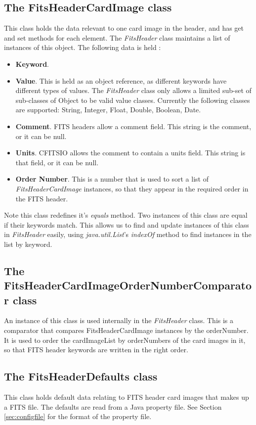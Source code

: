 \documentclass[10pt,a4paper]{article}
\begin{document}
\subsection{The FitsHeaderCardImage class}
This class holds the data relevant to one card image in the header, and has get and set methods for each
element. The {\em FitsHeader} class maintains a list of instances of this object. The following data
is held :
\begin{itemize}
\item {\bf Keyword}.
\item {\bf Value}. This is held as an object reference, as different keywords have different types of values.
	The {\em FitsHeader} class only allows a limited sub-set of sub-classes of Object to be valid value classes.
	Currently the following classes are supported: String, Integer, Float, Double, Boolean, Date.
\item {\bf Comment}. FITS headers allow a comment field. This string is the comment, or it can be null.
\item {\bf Units}. CFITSIO allows the comment to contain a units field. This string is that field, or it can
	be null.
\item {\bf Order Number}. This is a number that is used to sort a list of {\em FitsHeaderCardImage} instances,
	so that they appear in the required order in the FITS header.
\end{itemize}

Note this class redefines it's {\em equals} method. Two instances of this class are equal if their
keywords match. This allows us to find and update instances of this class in {\em FitsHeader} easily,
using {\em java.util.List}'s {\em indexOf} method to find instances in the list by keyword.

\subsection{The FitsHeaderCardImageOrderNumberComparator class}
An instance of this class is used internally in the {\em FitsHeader} class. This is a comparator that
compares FitsHeaderCardImage instances by the orderNumber. It is used to
order the cardImageList by orderNumbers of the card images in it, so that
FITS header keywords are written in the right order.

\subsection{The FitsHeaderDefaults class}
\label{sec:fitsheaderdefaultsclass}
This class holds default data relating to FITS header card images that makes up a FITS file. 
The defaults are read from a Java property file. See Section \ref{sec:configfile} for the format of the 
property file. 
\end{document}
